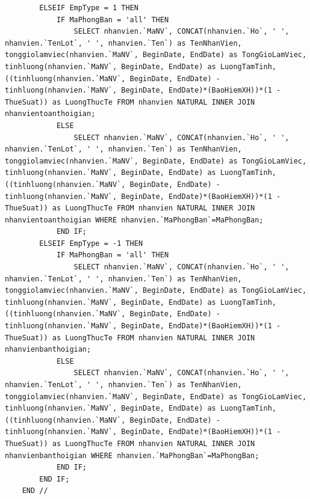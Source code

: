 \begin{verbatim}
        ELSEIF EmpType = 1 THEN
            IF MaPhongBan = 'all' THEN 
                SELECT nhanvien.`MaNV`, CONCAT(nhanvien.`Ho`, ' ', nhanvien.`TenLot`, ' ', nhanvien.`Ten`) as TenNhanVien, tonggiolamviec(nhanvien.`MaNV`, BeginDate, EndDate) as TongGioLamViec, tinhluong(nhanvien.`MaNV`, BeginDate, EndDate) as LuongTamTinh, ((tinhluong(nhanvien.`MaNV`, BeginDate, EndDate) - tinhluong(nhanvien.`MaNV`, BeginDate, EndDate)*(BaoHiemXH))*(1 - ThueSuat)) as LuongThucTe FROM nhanvien NATURAL INNER JOIN nhanvientoanthoigian;
            ELSE 
                SELECT nhanvien.`MaNV`, CONCAT(nhanvien.`Ho`, ' ', nhanvien.`TenLot`, ' ', nhanvien.`Ten`) as TenNhanVien, tonggiolamviec(nhanvien.`MaNV`, BeginDate, EndDate) as TongGioLamViec, tinhluong(nhanvien.`MaNV`, BeginDate, EndDate) as LuongTamTinh, ((tinhluong(nhanvien.`MaNV`, BeginDate, EndDate) - tinhluong(nhanvien.`MaNV`, BeginDate, EndDate)*(BaoHiemXH))*(1 - ThueSuat)) as LuongThucTe FROM nhanvien NATURAL INNER JOIN nhanvientoanthoigian WHERE nhanvien.`MaPhongBan`=MaPhongBan;
            END IF;
        ELSEIF EmpType = -1 THEN
            IF MaPhongBan = 'all' THEN 
                SELECT nhanvien.`MaNV`, CONCAT(nhanvien.`Ho`, ' ', nhanvien.`TenLot`, ' ', nhanvien.`Ten`) as TenNhanVien, tonggiolamviec(nhanvien.`MaNV`, BeginDate, EndDate) as TongGioLamViec, tinhluong(nhanvien.`MaNV`, BeginDate, EndDate) as LuongTamTinh, ((tinhluong(nhanvien.`MaNV`, BeginDate, EndDate) - tinhluong(nhanvien.`MaNV`, BeginDate, EndDate)*(BaoHiemXH))*(1 - ThueSuat)) as LuongThucTe FROM nhanvien NATURAL INNER JOIN nhanvienbanthoigian;
            ELSE 
                SELECT nhanvien.`MaNV`, CONCAT(nhanvien.`Ho`, ' ', nhanvien.`TenLot`, ' ', nhanvien.`Ten`) as TenNhanVien, tonggiolamviec(nhanvien.`MaNV`, BeginDate, EndDate) as TongGioLamViec, tinhluong(nhanvien.`MaNV`, BeginDate, EndDate) as LuongTamTinh, ((tinhluong(nhanvien.`MaNV`, BeginDate, EndDate) - tinhluong(nhanvien.`MaNV`, BeginDate, EndDate)*(BaoHiemXH))*(1 - ThueSuat)) as LuongThucTe FROM nhanvien NATURAL INNER JOIN nhanvienbanthoigian WHERE nhanvien.`MaPhongBan`=MaPhongBan;
            END IF;
        END IF;
    END //
\end{verbatim}

